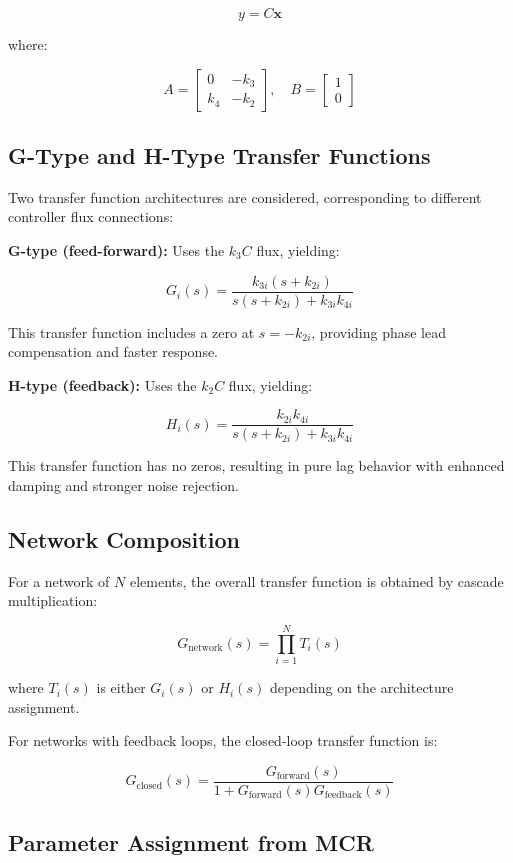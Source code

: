 \documentclass[
]{book}
\begin{document}
\[y = C\mathbf{x}\]

where:

\[A = \begin{bmatrix} 0 & -k_3 \\ k_4 & -k_2 \end{bmatrix}, \quad B = \begin{bmatrix} 1 \\ 0 \end{bmatrix}\]

\subsection{G-Type and H-Type Transfer Functions}\label{g-type-and-h-type-transfer-functions}

Two transfer function architectures are considered, corresponding to different controller flux connections:

\textbf{G-type (feed-forward):} Uses the \(k_3C\) flux, yielding:

\[G_i(s) = \frac{k_{3i}(s + k_{2i})}{s(s + k_{2i}) + k_{3i}k_{4i}}\]

This transfer function includes a zero at \(s = -k_{2i}\), providing phase lead compensation and faster response.

\textbf{H-type (feedback):} Uses the \(k_2C\) flux, yielding:

\[H_i(s) = \frac{k_{2i}k_{4i}}{s(s + k_{2i}) + k_{3i}k_{4i}}\]

This transfer function has no zeros, resulting in pure lag behavior with enhanced damping and stronger noise rejection.

\subsection{Network Composition}\label{network-composition}

For a network of \(N\) elements, the overall transfer function is obtained by cascade multiplication:

\[G_{\text{network}}(s) = \prod_{i=1}^{N} T_i(s)\]

where \(T_i(s)\) is either \(G_i(s)\) or \(H_i(s)\) depending on the architecture assignment.

For networks with feedback loops, the closed-loop transfer function is:

\[G_{\text{closed}}(s) = \frac{G_{\text{forward}}(s)}{1 + G_{\text{forward}}(s)G_{\text{feedback}}(s)}\]

\subsection{Parameter Assignment from MCR}\label{parameter-assignment-from-mcr}
\end{document}
